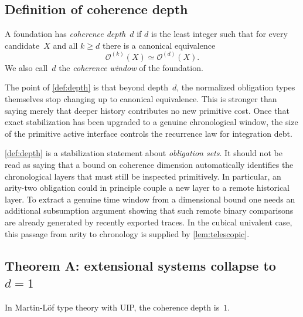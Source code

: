 \documentclass{lmcs}
\newcommand{\Ocal}{\mathcal{O}}
\begin{document}
\subsection{Definition of coherence depth}

\begin{defi}
\label{def:depth}
A foundation has \emph{coherence depth}~$d$ if $d$ is the least integer such that for every candidate~$X$ and all $k \geq d$ there is a canonical equivalence
\[
  \Ocal^{(k)}(X) \simeq \Ocal^{(d)}(X).
\]
We also call~$d$ the \emph{coherence window} of the foundation.
\end{defi}

The point of \autoref{def:depth} is that beyond depth~$d$, the normalized obligation types themselves stop changing up to canonical equivalence. This is stronger than saying merely that deeper history contributes no new primitive cost. Once that exact stabilization has been upgraded to a genuine chronological window, the size of the primitive active interface controls the recurrence law for integration debt.

\begin{rem}
\label{rem:arity-vs-chronology}
\autoref{def:depth} is a stabilization statement about \emph{obligation sets}. It should not be read as saying that a bound on coherence dimension automatically identifies the chronological layers that must still be inspected primitively. In particular, an arity-two obligation could in principle couple a new layer to a remote historical layer. To extract a genuine time window from a dimensional bound one needs an additional subsumption argument showing that such remote binary comparisons are already generated by recently exported traces. In the cubical univalent case, this passage from arity to chronology is supplied by \autoref{lem:telescopic}.
\end{rem}

\subsection{\texorpdfstring{Theorem A: extensional systems collapse to $d=1$}{Theorem A: extensional systems collapse to d=1}}

\begin{thm}
\label{thm:extensional}
In Martin-L\"of type theory with UIP, the coherence depth is~$1$.
\end{thm}
\end{document}
